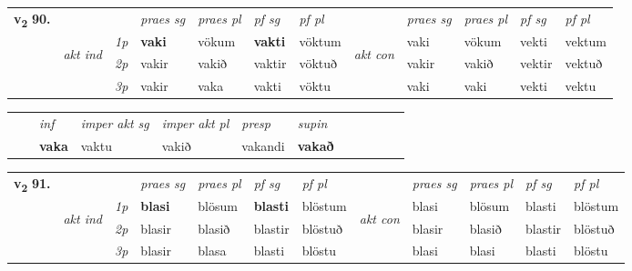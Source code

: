 \begin{tabular}{llllllllllll} \toprule
\multirow{4}{*}{{{\textbf{v{\textsubscript{2}}} \Large{\textbf{90.}}}}}  & &   &  \textit{praes sg}  & \textit{praes pl}  &\textit{ pf sg} & \textit{pf pl} &  &  \textit{praes sg}  & \textit{praes pl}  & \textit{pf sg} & \textit{pf pl } \\*
	\cmidrule{4-7} \cmidrule{9-12}
 & \multirow{3}{*}{\begin{turn}{90}\textit{akt ind}\end{turn}} & {\textit{1p}} & \textbf{vaki} & vökum    & \textbf{vakti} & vöktum & \multirow{3}{*}{\begin{turn}{90}\textit{akt con}\end{turn}} &vaki & vökum & vekti & vektum\\*
& &  {\textit{2p}} &  vakir  & vakið   & vaktir & vöktuð & & vakir & vakið & vektir & vektuð \\*
& &  {\textit{3p}} & vakir & vaka   & vakti & vöktu & & vaki & vaki& vekti & vektu  \\*
\cmidrule{4-7} \cmidrule{9-12}
\end{tabular}


\begin{tabular}{llllllllllll}
 & & \textit{inf} & \textit{imper akt sg} & \textit{imper akt pl}   & \textit{presp} & \textit{supin}       \\*
  & & \textbf{vaka} & vaktu  & vakið   & vakandi &  \textbf{vakað}   \\*
\cmidrule{1-12}
\end{tabular}



\begin{tabular}{llllllllllll} \toprule
\multirow{4}{*}{{{\textbf{v{\textsubscript{2}}} \Large{\textbf{91.}}}}}  & &   &  \textit{praes sg}  & \textit{praes pl}  &\textit{ pf sg} & \textit{pf pl} &  &  \textit{praes sg}  & \textit{praes pl}  & \textit{pf sg} & \textit{pf pl } \\*
	\cmidrule{4-7} \cmidrule{9-12}
 & \multirow{3}{*}{\begin{turn}{90}\textit{akt ind}\end{turn}} & {\textit{1p}} & \textbf{blasi} & blösum    & \textbf{blasti} & blöstum & \multirow{3}{*}{\begin{turn}{90}\textit{akt con}\end{turn}} &blasi & blösum & blasti & blöstum\\*
& &  {\textit{2p}} &  blasir  & blasið   & blastir & blöstuð & & blasir & blasið & blastir & blöstuð \\*
& &  {\textit{3p}} & blasir & blasa   & blasti & blöstu & & blasi & blasi& blasti & blöstu  \\*
\cmidrule{4-7} \cmidrule{9-12}
\end{tabular}


